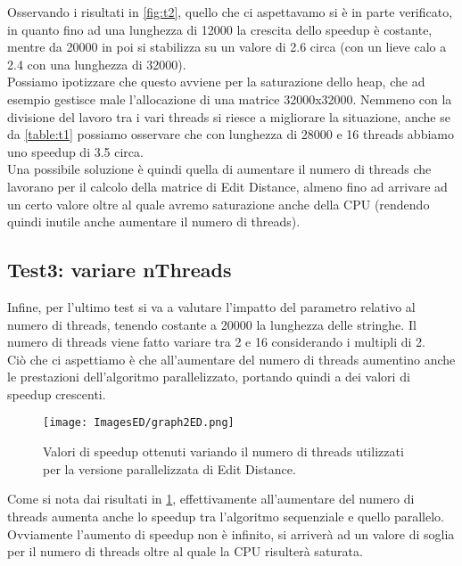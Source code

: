 \documentclass[10pt,twocolumn,letterpaper]{article}
\begin{document}
Osservando i risultati in \cref{fig:t2}, quello che ci aspettavamo si è in parte verificato, in quanto fino ad una lunghezza di 12000 la crescita dello speedup è costante, mentre da 20000 in poi si stabilizza su un valore di 2.6 circa (con un lieve calo a 2.4 con una lunghezza di 32000).\\
Possiamo ipotizzare che questo avviene per la saturazione dello heap, che ad esempio gestisce male l'allocazione di una matrice 32000x32000. Nemmeno con la divisione del lavoro tra i vari threads si riesce a migliorare la situazione, anche se da \cref{table:t1} possiamo osservare che con lunghezza di 28000 e 16 threads abbiamo uno speedup di 3.5 circa.\\
Una possibile soluzione è quindi quella di aumentare il numero di threads che lavorano per il calcolo della matrice di Edit Distance, almeno fino ad arrivare ad un certo valore oltre al quale avremo saturazione anche della CPU (rendendo quindi inutile anche aumentare il numero di threads).

\subsection{Test3: variare nThreads}
Infine, per l'ultimo test si va a valutare l'impatto del parametro relativo al numero di threads, tenendo costante a 20000 la lunghezza delle stringhe.
Il numero di threads viene fatto variare tra 2 e 16 considerando i multipli di 2.\\
Ciò che ci aspettiamo è che all'aumentare del numero di threads aumentino anche le prestazioni dell'algoritmo parallelizzato, portando quindi a dei valori di speedup crescenti.

\begin{figure}[h]
    \centering
    \texttt{[image: ImagesED/graph2ED.png]}
    \caption{Valori di speedup ottenuti variando il numero di threads utilizzati per la versione parallelizzata di Edit Distance.}
    \label{fig:t3}
\end{figure}

Come si nota dai risultati in \cref{fig:t3}, effettivamente all'aumentare del numero di threads aumenta anche lo speedup tra l'algoritmo sequenziale e quello parallelo. Ovviamente l'aumento di speedup non è infinito, si arriverà ad un valore di soglia per il numero di threads oltre al quale la CPU risulterà saturata.
\end{document}
